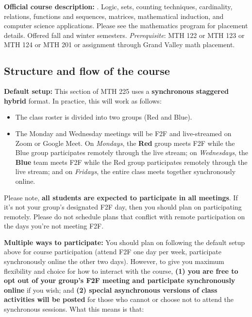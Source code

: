 \documentclass[]{article}
\providecommand{\tightlist}{%
  \setlength{\itemsep}{0pt}\setlength{\parskip}{0pt}}
\begin{document}
\textbf{Official course description:} . Logic, sets, counting
techniques, cardinality, relations, functions and sequences, matrices,
mathematical induction, and computer science applications. Please see
the mathematics program for placement details. Offered fall and winter
semesters. \emph{Prerequisite}: MTH 122 or MTH 123 or MTH 124 or MTH 201
or assignment through Grand Valley math placement.

\hypertarget{structure-and-flow-of-the-course}{%
\subsection{Structure and flow of the
course}\label{structure-and-flow-of-the-course}}

\textbf{Default setup:} This section of MTH 225 uses a
\textbf{synchronous staggered hybrid} format. In practice, this will
work as follows:

\begin{itemize}
\tightlist
\item
  The class roster is divided into two groups (Red and Blue).
\item
  The Monday and Wednesday meetings will be F2F and live-streamed on
  Zoom or Google Meet. On \emph{Mondays}, the \textbf{Red} group meets
  F2F while the Blue group participates remotely through the live
  stream; on \emph{Wednesdays}, the \textbf{Blue} team meets F2F while
  the Red group participates remotely through the live stream; and on
  \emph{Fridays}, the entire class meets together synchronously online.
\end{itemize}

Please note, \textbf{all students are expected to participate in all
meetings}. If it's not your group's designated F2F day, then you should
plan on participating remotely. Please do not schedule plans that
conflict with remote participation on the days you're not meeting F2F.

\textbf{Multiple ways to participate:} You should plan on following the
default setup above for course participation (attend F2F one day per
week, participate synchronously online the other two days). However, to
give you maximum flexibility and choice for how to interact with the
course, \textbf{(1) you are free to opt out of your group's F2F meeting
and participate synchronously online} if you wish; and \textbf{(2)
special asynchronous versions of class activities will be posted} for
those who cannot or choose not to attend the synchronous sessions. What
this means is that:
\end{document}
